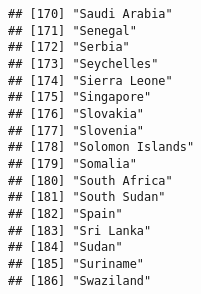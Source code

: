 \documentclass[
]{article}
\begin{document}
\begin{verbatim}
## [170] "Saudi Arabia"                                                                                                                                         
## [171] "Senegal"                                                                                                                                              
## [172] "Serbia"                                                                                                                                               
## [173] "Seychelles"                                                                                                                                           
## [174] "Sierra Leone"                                                                                                                                         
## [175] "Singapore"                                                                                                                                            
## [176] "Slovakia"                                                                                                                                             
## [177] "Slovenia"                                                                                                                                             
## [178] "Solomon Islands"                                                                                                                                      
## [179] "Somalia"                                                                                                                                              
## [180] "South Africa"                                                                                                                                         
## [181] "South Sudan"                                                                                                                                          
## [182] "Spain"                                                                                                                                                
## [183] "Sri Lanka"                                                                                                                                            
## [184] "Sudan"                                                                                                                                                
## [185] "Suriname"                                                                                                                                             
## [186] "Swaziland"                                                                                                                                            

\end{verbatim}
\end{document}

